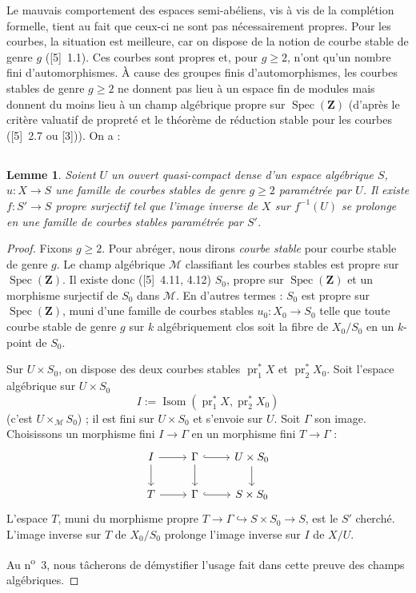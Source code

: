 \documentclass[12pt,a4paper]{article}
\theoremstyle{plain}
\newtheorem{lemma}[theorem]{Lemme}
\theoremstyle{definition}
\theoremstyle{remark}
\DeclareMathOperator{\Isom}{Isom}
\DeclareMathOperator{\Spec}{Spec}
\DeclareMathOperator{\pr}{pr}
\begin{document}
Le mauvais comportement des espaces semi-abéliens, vis à vis de la complétion formelle, tient au fait que ceux-ci ne sont pas nécessairement propres. Pour les courbes, la situation est meilleure, car on dispose de la notion de courbe stable de genre $g$ ([5]~1.1). Ces courbes sont propres et, pour $g \geq 2$, n'ont qu'un nombre fini d'automorphismes. À cause des groupes finis d'automorphismes, les courbes stables de genre $g \geq 2$ ne donnent pas lieu à un espace fin de modules mais donnent du moins lieu à un champ algébrique propre sur $\Spec(\mathbf{Z})$ (d'après le critère valuatif de propreté et le théorème de réduction stable pour les courbes ([5]~2.7 ou [3])). On a :

\subsection{}\label{sec:1.6}

\begin{lemma}
Soient $U$ un ouvert quasi-compact dense d'un espace algébrique $S$, $u : X \to S$ une famille de courbes stables de genre $g \geq 2$ paramétrée par $U$. Il existe $f : S' \to S$ propre surjectif tel que l'image inverse de $X$ sur $f^{-1}(U)$ se prolonge en une famille de courbes stables paramétrée par $S'$.
\end{lemma}

\begin{proof}
Fixons $g \geq 2$. Pour abréger, nous dirons \emph{courbe stable} pour courbe stable de genre $g$. Le champ algébrique $\mathcal{M}$ classifiant les courbes stables est propre sur $\Spec(\mathbf{Z})$. Il existe donc ([5]~4.11, 4.12) $S_0$, propre sur $\Spec(\mathbf{Z})$ et un morphisme surjectif de $S_0$ dans $\mathcal{M}$. En d'autres termes : $S_0$ est propre sur $\Spec(\mathbf{Z})$, muni d'une famille de courbes stables $u_0 : X_0 \to S_0$ telle que toute courbe stable de genre $g$ sur $k$ algébriquement clos soit la fibre de $X_0/S_0$ en un $k$-point de $S_0$.

Sur $U \times S_0$, on dispose des deux courbes stables $\pr_1^* X$ et $\pr_2^* X_0$. Soit l'espace algébrique sur $U \times S_0$
\[
I := \Isom(\pr_1^* X, \pr_2^* X_0)
\]
(c'est $U \times_{\mathcal{M}} S_0$) ; il est fini sur $U \times S_0$ et s'envoie sur $U$. Soit $\Gamma$ son image. Choisissons un morphisme fini $I \to \Gamma$ en un morphisme fini $T \to \Gamma$ :
\[
\begin{tikzcd}
I \arrow[r] \arrow[d] & \Gamma \arrow[r, hook] \arrow[d] & U \times S_0 \arrow[d] \\
T \arrow[r] & \Gamma \arrow[r, hook] & S \times S_0
\end{tikzcd}
\]
L'espace $T$, muni du morphisme propre $T \to \Gamma \hookrightarrow S \times S_0 \to S$, est le $S'$ cherché. L'image inverse sur $T$ de $X_0/S_0$ prolonge l'image inverse sur $I$ de $X/U$.

Au n\textsuperscript{o}~3, nous tâcherons de démystifier l'usage fait dans cette preuve des champs algébriques.
\end{proof}
\end{document}

